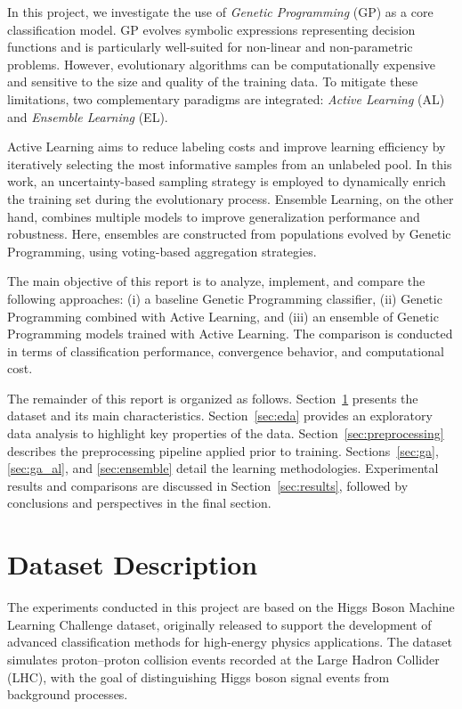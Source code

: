 \documentclass[12pt,a4paper]{article}
\begin{document}
In this project, we investigate the use of \textit{Genetic Programming} (GP) as a core
classification model.
GP evolves symbolic expressions representing decision functions and is particularly well-suited
for non-linear and non-parametric problems.
However, evolutionary algorithms can be computationally expensive and sensitive to the
size and quality of the training data.
To mitigate these limitations, two complementary paradigms are integrated:
\textit{Active Learning} (AL) and \textit{Ensemble Learning} (EL).

Active Learning aims to reduce labeling costs and improve learning efficiency by iteratively
selecting the most informative samples from an unlabeled pool.
In this work, an uncertainty-based sampling strategy is employed to dynamically enrich
the training set during the evolutionary process.
Ensemble Learning, on the other hand, combines multiple models to improve generalization
performance and robustness.
Here, ensembles are constructed from populations evolved by Genetic Programming,
using voting-based aggregation strategies.

The main objective of this report is to analyze, implement, and compare the following approaches:
(i) a baseline Genetic Programming classifier,
(ii) Genetic Programming combined with Active Learning,
and (iii) an ensemble of Genetic Programming models trained with Active Learning.
The comparison is conducted in terms of classification performance, convergence behavior,
and computational cost.

The remainder of this report is organized as follows.
Section~\ref{sec:dataset} presents the dataset and its main characteristics.
Section~\ref{sec:eda} provides an exploratory data analysis to highlight key properties of the data.
Section~\ref{sec:preprocessing} describes the preprocessing pipeline applied prior to training.
Sections~\ref{sec:ga}, \ref{sec:ga_al}, and \ref{sec:ensemble} detail the learning methodologies.
Experimental results and comparisons are discussed in Section~\ref{sec:results},
followed by conclusions and perspectives in the final section.

\section{Dataset Description}
\label{sec:dataset}

The experiments conducted in this project are based on the Higgs Boson Machine Learning
Challenge dataset, originally released to support the development of advanced classification
methods for high-energy physics applications.
The dataset simulates proton–proton collision events recorded at the Large Hadron Collider (LHC),
with the goal of distinguishing Higgs boson signal events from background processes.
\end{document}
